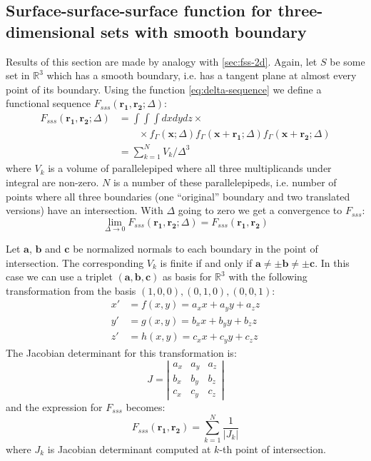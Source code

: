 \documentclass[preprint]{elsarticle}
\begin{document}
\subsection{Surface-surface-surface function for three-dimensional sets with
  smooth boundary}
\label{sec:fsss-3d}
Results of this section are made by analogy with \cref{sec:fss-2d}. Again, let
$S$ be some set in $\mathbb{R}^3$ which has a smooth boundary, i.e. has a
tangent plane at almost every point of its boundary. Using the function
\cref{eq:delta-sequence} we define a functional sequence
$F_{sss}(\bm{r_1}, \bm{r_2}; \Delta)$:
\begin{equation}
  \begin{aligned}
    F_{sss}(\bm{r_1}, \bm{r_2}; \Delta) &= \int\int\int dx dy dz \times \\
    &\qquad \times f_\Gamma(\bm{x}; \Delta) f_\Gamma(\bm{x} + \bm{r_1}; \Delta)
    f_\Gamma(\bm{x} + \bm{r_2}; \Delta) \\
    &= \sum_{k=1}^N V_k/\Delta^3
  \end{aligned}
\end{equation}
where $V_k$ is a volume of parallelepiped where all three multiplicands under
integral are non-zero. $N$ is a number of these parallelepipeds, i.e. number of
points where all three boundaries (one ``original'' boundary and two translated
versions) have an intersection. With $\Delta$ going to zero we get a convergence
to $F_{sss}$:
\begin{equation}
  \lim_{\Delta \to 0} F_{sss}(\bm{r_1}, \bm{r_2}; \Delta) = F_{sss}(\bm{r_1},
  \bm{r_2})
\end{equation}

Let $\bm{a}$, $\bm{b}$ and $\bm{c}$ be normalized normals to each boundary in
the point of intersection. The corresponding $V_k$ is finite if and only if
$\bm{a} \ne \pm \bm{b} \ne \pm \bm{c}$. In this case we can use a triplet
$(\bm{a}, \bm{b}, \bm{c})$ as basis for $\mathbb{R}^3$ with the following
transformation from the basis $(1,0,0), (0,1,0), (0, 0, 1)$:
\begin{equation}
  \begin{aligned}
    x' &= f(x, y) = a_x x + a_y y + a_z z \\
    y' &= g(x, y) = b_x x + b_y y + b_z z \\
    z' &= h(x, y) = c_x x + c_y y + c_z z
  \end{aligned}
\end{equation}
The Jacobian determinant for this transformation is:
\begin{equation}
  J = \left|
  \begin{array}{ccc}
    a_x & a_y & a_z \\
    b_x & b_y & b_z \\
    c_x & c_y & c_z
  \end{array}
  \right|
\end{equation}
and the expression for $F_{sss}$ becomes:
\begin{equation}
  F_{sss}(\bm{r_1}, \bm{r_2}) = \sum_{k=1}^N \frac{1}{|J_k|} \label{eq:fsss-3d}
\end{equation}
where $J_k$ is Jacobian determinant computed at $k$-th point of
intersection.
\end{document}
